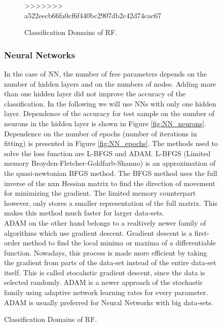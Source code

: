 \begin{figure}[h]
\begin{figure}[h]
>>>>>>> a522eecb66fa0cf6f440bc2907db2c42d74cac67
\caption{Classification Domains of RF.  }
\label{fig:RF_domains}
\end{figure}


\subsubsection{Neural Networks}

In the case of NN, the number of free parameters depends on the number of hidden layers and on the numbers of nodes.
Adding more than one hidden layer did not improve the accuracy of the classification.
In the following we will use NNs with only one hidden layer.
Dependence of the accuracy for test sample on the number of neurons in the hidden layer is shown in Figure \ref{fig:NN_neurons}.
Dependence on the number of epochs (number of iterations in fitting) is presented in Figure \ref{fig:NN_epochs}. 
The methods used to solve the loss function are L-BFGS and ADAM. L-BFGS (Limited memory Broyden-Fletcher-Goldfarb-Shanno) is an approximation of the quasi-newtonian BFGS method. The BFGS method uses the full inverse of the nxn Hessian matrix to find the direction of movement for minimizing the gradient. The limited memory counterpart however, only stores a smaller representation of the full matrix. This makes this method much faster for larger data-sets.\\
ADAM on the other hand belongs to a realtively newer family of algorithms which use gradient descent. Gradient descent is a first-order method to find the local minima or maxima of a differentiable function. Nowadays, this process is made more efficient by taking the gradient from parts of the data-set instead of the entire data-set itself. This is called stocahstic gradient descent, since the data is selected randomly. ADAM is a newer approach of the stochastic family using adaptive network learning rates for every parameter. ADAM is usually preferred for Neural Networks with big data-sets.\\ 


\end{figure}

